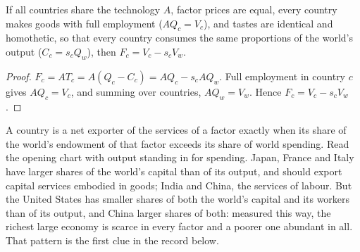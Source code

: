 \begin{proposition}\label{prop:b3:factor-endowments:hov}
If all countries share the technology $A$, factor prices are equal, every
country makes goods with full employment ($A Q_c = V_c$), and tastes are identical
and homothetic, so that every country consumes the same proportions of the
world's output ($C_c = s_c Q_w$), then $F_c = V_c - s_c V_w$.
\end{proposition}

\begin{proof}
$F_c = A T_c = A(Q_c - C_c) = AQ_c - s_c AQ_w$. Full employment in country $c$ gives
$AQ_c = V_c$, and summing over countries, $AQ_w = V_w$. Hence $F_c = V_c - s_c V_w$.
\end{proof}

A country is a net exporter of the services of a factor exactly when its share
of the world's endowment of that factor exceeds its share of world spending.
Read the opening chart with output standing in for spending. Japan, France and
Italy have larger shares of the world's capital than of its output, and should
export capital services embodied in goods; India and China, the services of
labour. But the United States has smaller shares of both the world's capital and
its workers than of its output, and China larger shares of both: measured this
way, the richest large economy is scarce in every factor and a poorer one abundant
in all. That pattern is the first clue in the record below.


